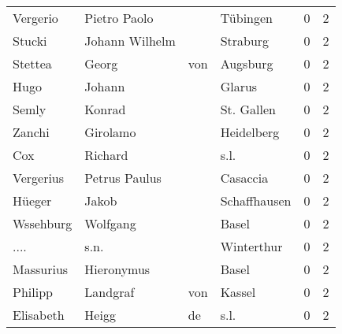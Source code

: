 \begin{tabular}{llllrr}
                 Vergerio &                       Pietro Paolo &             &                                    Tübingen &          0 &         2 \\
                   Stucki &                     Johann Wilhelm &             &                                    Straburg &          0 &         2 \\
                  Stettea &                              Georg &         von &                                    Augsburg &          0 &         2 \\
                     Hugo &                             Johann &             &                                      Glarus &          0 &         2 \\
                    Semly &                             Konrad &             &                                  St. Gallen &          0 &         2 \\
                   Zanchi &                           Girolamo &             &                                  Heidelberg &          0 &         2 \\
                      Cox &                            Richard &             &                                        s.l. &          0 &         2 \\
                Vergerius &                      Petrus Paulus &             &                                    Casaccia &          0 &         2 \\
                   Hüeger &                              Jakob &             &                                Schaffhausen &          0 &         2 \\
                Wssehburg &                           Wolfgang &             &                                       Basel &          0 &         2 \\
                     .... &                               s.n. &             &                                  Winterthur &          0 &         2 \\
                Massurius &                         Hieronymus &             &                                       Basel &          0 &         2 \\
                  Philipp &                           Landgraf &         von &                                      Kassel &          0 &         2 \\
                Elisabeth &                              Heigg &          de &                                        s.l. &          0 &         2 \\

\end{tabular}
